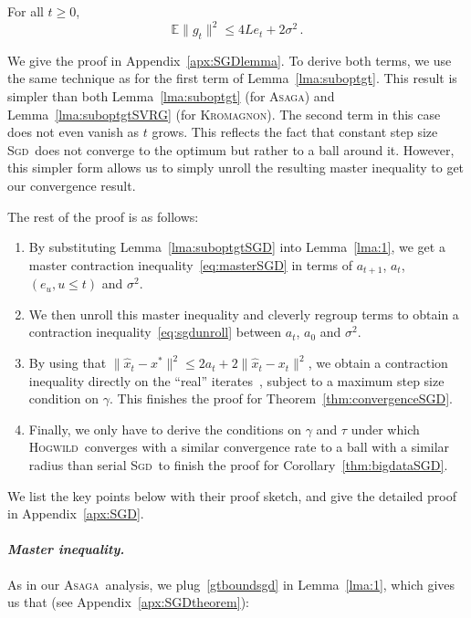 \documentclass[twoside, 11pt]{article}
\newcommand{\stepsize}{\gamma}
\newcommand{\overlap}{\tau}
\newcommand{\lipschitz}{L}
\newcommand{\E}{\mathbb{E}}
\newcommand{\ASAGA}{\textsc{Asaga}}
\newcommand{\Hogwild}{\textsc{Hogwild}}
\newcommand{\SGD}{\textsc{Sgd}}
\newcommand{\KROMAGNON}{\textsc{Kromagnon}}
\begin{document}
\begin{lemma} [Suboptimality bound on $\E \|g_t\|^2$]\label{lma:suboptgtSGD}
	For all $t \geq 0$,
	\begin{equation}\label{gtboundsgd}
	\E\|g_t\|^2
	\leq 4\lipschitz e_t
	+ 2 \sigma^2\, .
	\end{equation}
\end{lemma}
We give the proof in Appendix~\ref{apx:SGDlemma}. To derive both terms, we use the same technique as for the first term of Lemma~\ref{lma:suboptgt}.
This result is simpler than both Lemma~\ref{lma:suboptgt} (for \ASAGA) and Lemma~\ref{lma:suboptgtSVRG} (for \KROMAGNON).
The second term in this case does not even vanish as $t$ grows.
This reflects the fact that constant step size \SGD\ does not converge to the optimum but rather to a ball around it.
However, this simpler form allows us to simply unroll the resulting master inequality to get our convergence result.

The rest of the proof is as follows:
\begin{enumerate}
	\item By substituting Lemma~\ref{lma:suboptgtSGD} into Lemma~\ref{lma:1}, we get a master contraction inequality~\eqref{eq:masterSGD} in terms of $a_{t+1}$, $a_t$, $(e_u, u\leq t)$ and $\sigma^2$.
	\item We then unroll this master inequality and cleverly regroup terms to obtain a contraction inequality~\eqref{eq:sgdunroll} between $a_t$, $a_0$ and $\sigma^2$.
	\item By using that $\|\hat x_t - x^*\|^2 \leq 2 a_t + 2\|\hat x_t - x_t\|^2$, we obtain a contraction inequality directly on the ``real'' iterates~\citep[as opposed to the ``virtual'' iterates as in][]{mania}, subject to a maximum step size condition on $\stepsize$. This finishes the proof for Theorem~\ref{thm:convergenceSGD}.
	\item Finally, we only have to derive the conditions on $\stepsize$ and $\overlap$ under which \Hogwild\ converges with a similar convergence rate to a ball with a similar radius than serial \SGD\ to finish the proof for Corollary~\ref{thm:bigdataSGD}.
\end{enumerate}

We list the key points below with their proof sketch, and give the detailed proof in Appendix~\ref{apx:SGD}.

\paragraph{\textit{Master inequality.}}
As in our \ASAGA\ analysis, we plug~\eqref{gtboundsgd} in Lemma~\ref{lma:1}, which gives us that (see Appendix~\ref{apx:SGDtheorem}):
\end{document}
